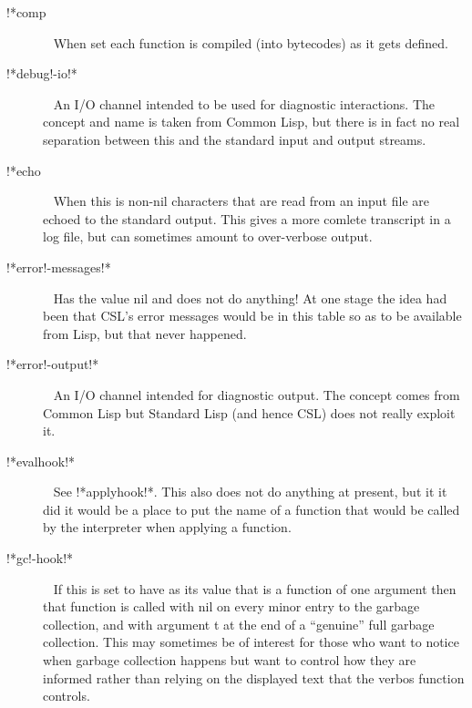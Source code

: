 \documentclass[a4paper,11pt]{article}
\begin{document}
\begin{description}
\item [{\ttfamily !*comp}]  ~\newline
When set each function is compiled (into bytecodes) as it gets defined.

\item [{\ttfamily !*debug!-io!*}]  ~\newline
An I/O channel intended to be used for diagnostic interactions. The concept
and name is taken from Common Lisp, but there is in fact no real separation
between this and the standard input and output streams.

\item [{\ttfamily !*echo}]  ~\newline
When this is non-nil characters that are read from an input file are
echoed to the standard output. This gives a more comlete transcript in
a log file, but can sometimes amount to over-verbose output.

\item [{\ttfamily !*error!-messages!*}]  ~\newline
Has the value nil and does not do anything! At one stage the idea had been
that CSL's error messages would be in this table so as to be available
from Lisp, but that never happened.

\item [{\ttfamily !*error!-output!*}]  ~\newline
An I/O channel intended for diagnostic output. The concept comes from
Common Lisp but Standard Lisp (and hence CSL) does not really exploit it.

\item [{\ttfamily !*evalhook!*}]  ~\newline
See {\ttfamily !*applyhook!*}. This also does not do anything at present,
but it it did it would be a place to put the name of a function that
would be called by the interpreter when applying a function.

\item [{\ttfamily !*gc!-hook!*}]  ~\newline
If this is set to have as its value that is a function of one argument then
that function is called with {\ttfamily nil} on every minor entry to the
garbage collection, and with argument {\ttfamily t} at the end of a ``genuine''
full garbage collection. This may sometimes be of interest for those who
want to notice when garbage collection happens but want to control how
they are informed rather than relying on the displayed text that the
{\ttfamily verbos} function controls.


\end{description}
\end{document}
